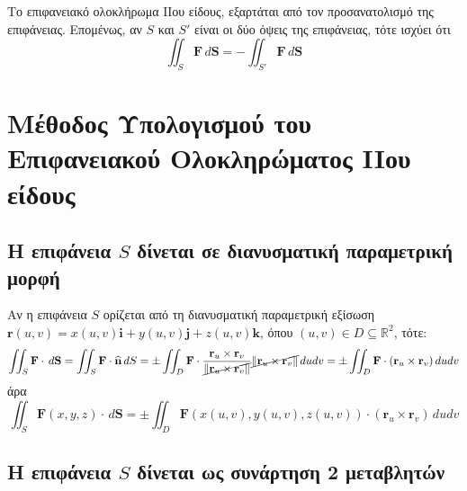 \begin{rem}
  Το επιφανειακό ολοκλήρωμα ΙΙου είδους, εξαρτάται από τον προσανατολισμό της επιφάνειας.
  Επομένως, αν $S$ και $ S' $ είναι οι δύο όψεις της επιφάνειας, τότε ισχύει ότι 
  \[
    \iint_{S} \mathbf{F} \,{d \mathbf{S}} = - \iint_{S'} \mathbf{F} \,{d \mathbf{S}} 
  \] 
\end{rem}


\section{Μέθοδος Υπολογισμού του Επιφανειακού Ολοκληρώματος IIου είδους}

\subsection*{Η επιφάνεια $S$ δίνεται σε διανυσματική παραμετρική μορφή}

Αν η επιφάνεια $S$ ορίζεται από τη διανυσματική παραμετρική εξίσωση 
$ \mathbf{r}(u,v) = x(u,v)\mathbf{i}+y(u,v)\mathbf{j}+z(u,v)\mathbf{k} $, όπου 
$ (u,v) \in D \subseteq \mathbb{R}^{2} $, τότε:
\[
  \iint_{S} \mathbf{F} \cdot \,{d\mathbf{S}} = \iint_{S} \mathbf{F} \cdot
  \mathbf{\widehat{n}}\,{dS} = \pm\iint_{D} \mathbf{F} \cdot \frac{\mathbf{r}_{u} \times
  \mathbf{r}_{v}}{\cancel{\norm{\mathbf{r}_{u} \times \mathbf{r}_{v}}}}
  \cancel{\norm{\mathbf{r}_{u} \times \mathbf{r}_{v}}}\,{du}{dv} = \pm\iint_{D} 
  \mathbf{F} \cdot (\mathbf{r}_{u} \times \mathbf{r}_{v}) \,{du}{dv}
\]
άρα
\[
  \iint_{S} \mathbf{F}(x,y,z) \cdot \,{d\mathbf{S}} = \pm\iint_{D} 
  \mathbf{F}(x(u,v),y(u,v),z(u,v)) \cdot (\mathbf{r}_{u} \times \mathbf{r}_{v}) 
  \,{du}{dv}
\]

\subsection*{Η επιφάνεια $S$ δίνεται ως συνάρτηση 2 μεταβλητών}

